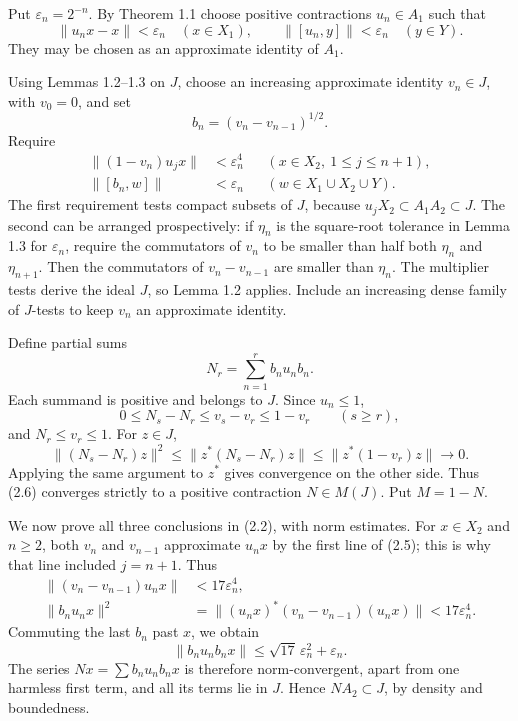 \documentclass[
  11pt,
]{article}
\begin{document}
Put \(\varepsilon_n=2^{-n}\). By Theorem 1.1 choose positive
contractions \(u_n\in A_1\) such that \[
\|u_nx-x\|<\varepsilon_n\quad(x\in X_1),\qquad
\|[u_n,y]\|<\varepsilon_n\quad(y\in Y).
\tag{2.3}
\] They may be chosen as an approximate identity of \(A_1\).

Using Lemmas 1.2--1.3 on \(J\), choose an increasing approximate
identity \(v_n\in J\), with \(v_0=0\), and set \[
b_n=(v_n-v_{n-1})^{1/2}.
\tag{2.4}
\] Require \[
\begin{aligned}
\|(1-v_n)u_jx\|&<\varepsilon_n^4
&& (x\in X_2,\ 1\leq j\leq n+1),\\
\|[b_n,w]\|&<\varepsilon_n
&& (w\in X_1\cup X_2\cup Y).
\end{aligned}
\tag{2.5}
\] The first requirement tests compact subsets of \(J\), because
\(u_jX_2\subset A_1A_2\subset J\). The second can be arranged
prospectively: if \(\eta_n\) is the square-root tolerance in Lemma 1.3
for \(\varepsilon_n\), require the commutators of \(v_n\) to be smaller
than half both \(\eta_n\) and \(\eta_{n+1}\). Then the commutators of
\(v_n-v_{n-1}\) are smaller than \(\eta_n\). The multiplier tests derive
the ideal \(J\), so Lemma 1.2 applies. Include an increasing dense
family of \(J\)-tests to keep \(v_n\) an approximate identity.

Define partial sums \[
N_r=\sum_{n=1}^r b_nu_nb_n.
\tag{2.6}
\] Each summand is positive and belongs to \(J\). Since \(u_n\leq1\), \[
0\leq N_s-N_r\leq v_s-v_r\leq1-v_r\qquad(s\geq r),
\tag{2.7}
\] and \(N_r\leq v_r\leq1\). For \(z\in J\), \[
\|(N_s-N_r)z\|^2
\leq\|z^*(N_s-N_r)z\|
\leq\|z^*(1-v_r)z\|\longrightarrow0.
\tag{2.8}
\] Applying the same argument to \(z^*\) gives convergence on the other
side. Thus (2.6) converges strictly to a positive contraction
\(N\in M(J)\). Put \(M=1-N\).

We now prove all three conclusions in (2.2), with norm estimates. For
\(x\in X_2\) and \(n\geq2\), both \(v_n\) and \(v_{n-1}\) approximate
\(u_nx\) by the first line of (2.5); this is why that line included
\(j=n+1\). Thus \[
\begin{aligned}
\|(v_n-v_{n-1})u_nx\|&<17\varepsilon_n^4,\\
\|b_nu_nx\|^2
&=\|(u_nx)^*(v_n-v_{n-1})(u_nx)\|
<17\varepsilon_n^4.
\end{aligned}
\tag{2.9}
\] Commuting the last \(b_n\) past \(x\), we obtain \[
\|b_nu_nb_nx\|
\leq\sqrt{17}\,\varepsilon_n^2+\varepsilon_n.
\tag{2.10}
\] The series \(Nx=\sum b_nu_nb_nx\) is therefore norm-convergent, apart
from one harmless first term, and all its terms lie in \(J\). Hence
\(NA_2\subset J\), by density and boundedness.
\end{document}
